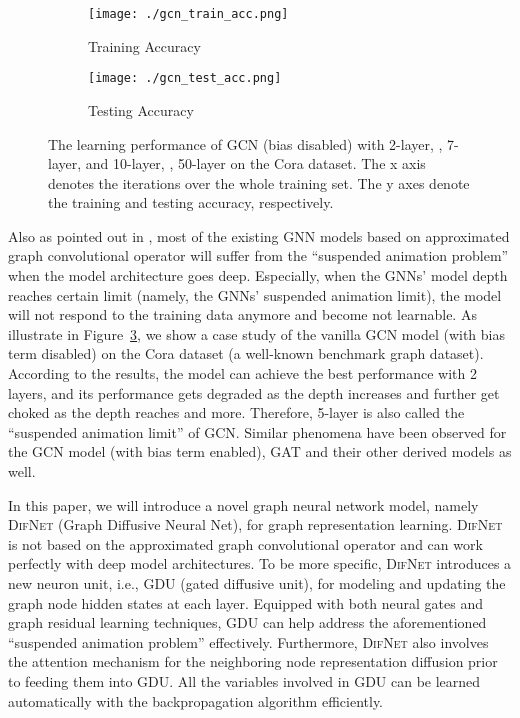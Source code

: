 \documentclass{article}
\newcommand{\our}{\textsc{DifNet}}
\newcommand{\gdu}{\textsc{GDU}}
\newcommand{\gcn}{\textsc{GCN}}
\newcommand{\gat}{\textsc{GAT}}
\begin{document}
\begin{figure}
    \centering
    \begin{subfigure}[b]{.23\textwidth}
    	\texttt{[image: ./gcn\_train\_acc.png]}
    	\caption{Training Accuracy}\label{fig:gcn_acc_train}
    \end{subfigure}\hfill
    \begin{subfigure}[b]{.23\textwidth}
    	\texttt{[image: ./gcn\_test\_acc.png]}
    	\caption{Testing Accuracy}\label{fig:gcn_acc_test}
    \end{subfigure}\caption{The learning performance of {\gcn} (bias disabled) with 2-layer, , 7-layer, and 10-layer, , 50-layer on the Cora dataset. The x axis denotes the iterations over the whole training set. The y axes denote the training and testing accuracy, respectively.}\label{fig:gcn_acc_analysis}
\end{figure}


Also as pointed out in \cite{Zhang_GResNet_19}, most of the existing GNN models based on approximated graph convolutional operator will suffer from the ``suspended animation problem'' when the model architecture goes deep. Especially, when the GNNs' model depth reaches certain limit (namely, the GNNs' suspended animation limit), the model will not respond to the training data anymore and become not learnable. As illustrate in Figure~\ref{fig:gcn_acc_analysis}, we show a case study of the vanilla {\gcn} model (with bias term disabled) on the Cora dataset (a well-known benchmark graph dataset). According to the results, the model can achieve the best performance with 2 layers, and its performance gets degraded as the depth increases and further get choked as the depth reaches  and more. Therefore, 5-layer is also called the ``suspended animation limit'' of {\gcn}. Similar phenomena have been observed for the {\gcn} model (with bias term enabled), {\gat} and their other derived models as well.

In this paper, we will introduce a novel graph neural network model, namely {\our} (Graph Diffusive Neural Net), for graph representation learning. {\our} is not based on the approximated graph convolutional operator and can work perfectly with deep model architectures. To be more specific, {\our} introduces a new neuron unit, i.e., {\gdu} (gated diffusive unit), for modeling and updating the graph node hidden states at each layer. Equipped with both neural gates and graph residual learning techniques, {\gdu} can help address the aforementioned ``suspended animation problem'' effectively. Furthermore, {\our} also involves the attention mechanism for the neighboring node representation diffusion prior to feeding them into {\gdu}. All the variables involved in {\gdu} can be learned automatically with the backpropagation algorithm efficiently.
\end{document}
